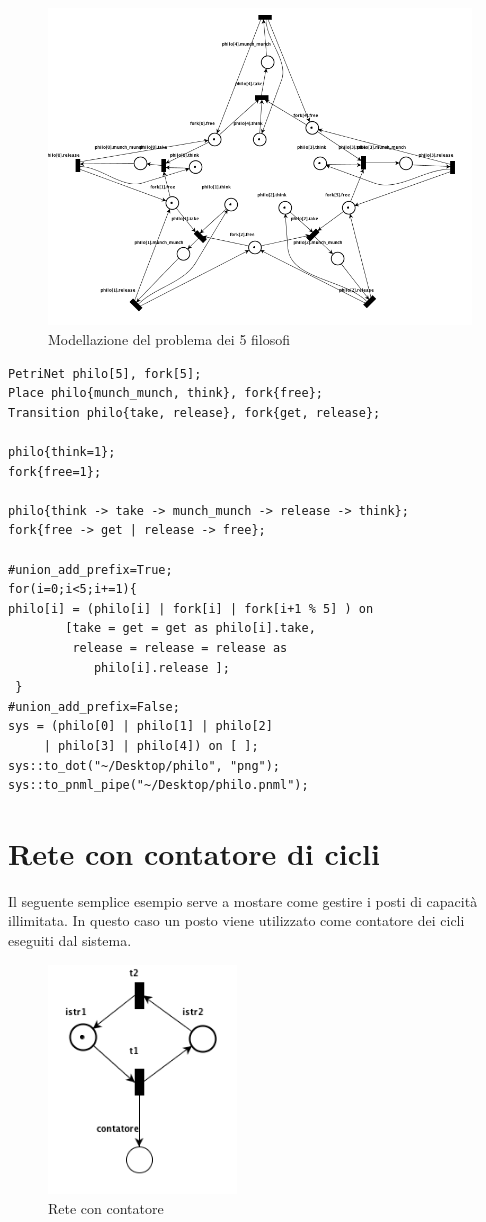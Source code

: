 \documentclass[italian,12pt]{book}
\begin{document}
\begin{figure}[htb]
\centerline{\includegraphics[width=12cm]{img/philosophers.png}}
\caption{Modellazione del problema dei 5 filosofi}\label{fig:philosophers.png}
\end{figure}

\begin{verbatim}PetriNet philo[5], fork[5];
Place philo{munch_munch, think}, fork{free};
Transition philo{take, release}, fork{get, release};

philo{think=1};
fork{free=1};

philo{think -> take -> munch_munch -> release -> think};
fork{free -> get | release -> free};

#union_add_prefix=True;
for(i=0;i<5;i+=1){
philo[i] = (philo[i] | fork[i] | fork[i+1 % 5] ) on 
        [take = get = get as philo[i].take, 
         release = release = release as 
            philo[i].release ];
 }
#union_add_prefix=False;
sys = (philo[0] | philo[1] | philo[2] 
     | philo[3] | philo[4]) on [ ];
sys::to_dot("~/Desktop/philo", "png");
sys::to_pnml_pipe("~/Desktop/philo.pnml");
\end{verbatim}

\section{Rete con contatore di cicli}
Il seguente semplice esempio serve a mostare come gestire i posti di
capacità illimitata. In questo caso un posto viene utilizzato come
contatore dei cicli eseguiti dal sistema.

\begin{figure}[htb]
\centerline{\includegraphics[width=5cm]{img/contatore.png}}
\caption{Rete con contatore}\label{fig:contatore.png}
\end{figure}
\end{document}
